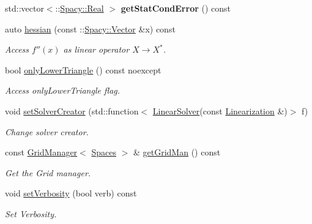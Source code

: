 \begin{DoxyCompactItemize}
\item 
\hypertarget{classSpacy_1_1KaskadeParabolic_1_1C2Functional_a5e235e5353e12cde73588350b9df5d91}{std\-::vector$<$\-::\hyperlink{classSpacy_1_1Real}{Spacy\-::\-Real} $>$ {\bfseries get\-Stat\-Cond\-Error} () const }\label{classSpacy_1_1KaskadeParabolic_1_1C2Functional_a5e235e5353e12cde73588350b9df5d91}

\item 
auto \hyperlink{classSpacy_1_1KaskadeParabolic_1_1C2Functional_a3f0302704e5134a6464bf100df489dc0}{hessian} (const \-::\hyperlink{classSpacy_1_1Vector}{Spacy\-::\-Vector} \&x) const 
\begin{DoxyCompactList}\small\item\em Access $f''(x)$ as linear operator $X\rightarrow X^*$. \end{DoxyCompactList}\item 
bool \hyperlink{classSpacy_1_1KaskadeParabolic_1_1C2Functional_a98069334677dc332ad5692c683b00ef3}{only\-Lower\-Triangle} () const noexcept
\begin{DoxyCompactList}\small\item\em Access only\-Lower\-Triangle flag. \end{DoxyCompactList}\item 
void \hyperlink{classSpacy_1_1KaskadeParabolic_1_1C2Functional_a3f1d511aac55c7f413f3cf750a18e91e}{set\-Solver\-Creator} (std\-::function$<$ \hyperlink{namespaceSpacy_adcd0d78166a9c972b8a2e5a689fc2d03}{Linear\-Solver}(const \hyperlink{classSpacy_1_1KaskadeParabolic_1_1C2Functional_a21e92f3995a97298d1e7e9788edc34dd}{Linearization} \&)$>$ f)
\begin{DoxyCompactList}\small\item\em Change solver creator. \end{DoxyCompactList}\item 
const \hyperlink{classSpacy_1_1KaskadeParabolic_1_1GridManager}{Grid\-Manager}$<$ \hyperlink{classSpacy_1_1KaskadeParabolic_1_1C2Functional_aa248da3955a06276ee5feabe3533a1d7}{Spaces} $>$ \& \hyperlink{classSpacy_1_1KaskadeParabolic_1_1C2Functional_a8618a8ae688a8303fb818c9b7358b5e9}{get\-Grid\-Man} () const 
\begin{DoxyCompactList}\small\item\em Get the Grid manager. \end{DoxyCompactList}\item 
void \hyperlink{classSpacy_1_1KaskadeParabolic_1_1C2Functional_a6d6ad5675d76e7f9da72cd47427c6902}{set\-Verbosity} (bool verb) const 
\begin{DoxyCompactList}\small\item\em Set Verbosity. \end{DoxyCompactList}\item 

\end{DoxyCompactItemize}
